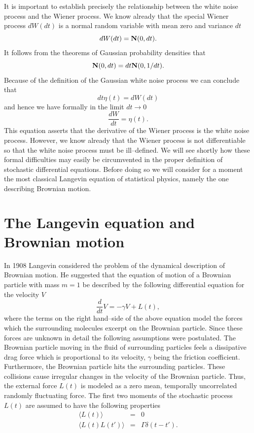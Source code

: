 It is important to establish precisely the relationship
between the white noise process and the Wiener process.
We know already that the special Wiener process $dW(dt)$
is a normal random variable with mean zero and variance $dt$
\begin{equation*}
dW(dt) = {\bf N}(0,dt).
\end{equation*}
It follows from the theorems of Gaussian probability densities
that
\begin{equation*}
{\bf N}(0,dt) =  dt {\bf N}(0,1/dt).
\end{equation*}
Because of the definition of the Gaussian white noise process we 
can conclude that
\begin{equation*}
dt \eta(t) = dW(dt)
\end{equation*}
and hence we have formally in the limit $dt \rightarrow 0$
\begin{equation*}
\frac{dW}{dt} = \eta(t).
\end{equation*}
This equation asserts that the derivative of the Wiener process is 
the white noise process. However, we know already that the Wiener
process is not differentiable so that the white noise process must 
be ill--defined. We will see shortly how these formal difficulties 
may easily be circumvented in the proper definition
of stochastic differential equations. Before doing so we will 
consider for a 
moment the most classical Langevin equation of statistical 
physics, namely the one describing Brownian motion.

\section{The Langevin equation and Brownian motion}
In 1908 Langevin considered the problem of the dynamical 
description of Brownian motion. He suggested that the equation of 
motion of a Brownian particle with mass $m=1$ be described by the
following differential equation for the velocity $V$
\begin{equation}
\label{LANGEVIN}
\frac{d}{dt} V = -\gamma V + L(t),
\end{equation}
where the terms on the right hand--side of the above equation 
model the forces which the surrounding molecules excerpt on the 
Brownian particle. Since these forces are unknown in detail the 
following assumptions were postulated. The Brownian particle 
moving in the fluid of surrounding particles feels
a dissipative drag force which is proportional to its velocity, $\gamma$  being 
the friction coefficient. Furthermore, the Brownian particle hits
the surrounding particles. These collisions cause irregular 
changes in the velocity of the Brownian particle. Thus, the external force
$L(t)$ is modeled as a zero mean, temporally uncorrelated
randomly fluctuating force. The first two moments of the
stochastic process $L(t)$ are assumed to 
have the following properties
\begin{eqnarray*}
\langle L(t) \rangle &=& 0 \\
\langle L(t) L(t') \rangle &=& \Gamma \delta(t-t').
\end{eqnarray*}

